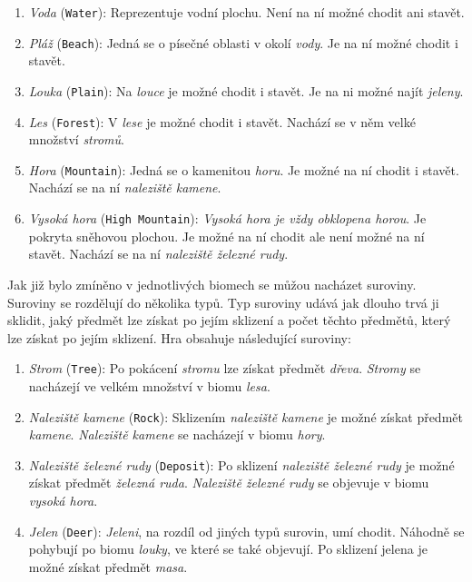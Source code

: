 \begin{enumerate}
    \item \textit{Voda} (\verb|Water|): Reprezentuje vodní plochu. Není na ní možné chodit ani stavět.
    \item \textit{Pláž} (\verb|Beach|): Jedná se o písečné oblasti v okolí \textit{vody}. Je na ní možné chodit i stavět.
    \item \textit{Louka} (\verb|Plain|): Na \textit{louce} je možné chodit i stavět. Je na ni možné najít \textit{jeleny}.
    \item \textit{Les} (\verb|Forest|): V \textit{lese} je možné chodit i stavět. Nachází se v něm velké množství \textit{stromů}.
    \item \textit{Hora} (\verb|Mountain|): Jedná se o kamenitou \textit{horu}. Je možné na ní chodit i stavět. Nachází se na ní \textit{naleziště kamene}.
    \item \textit{Vysoká hora} (\verb|High Mountain|): \textit{Vysoká hora je vždy obklopena \textit{horou}}. Je pokryta sněhovou plochou. Je možné na ní chodit ale není možné na ní stavět. Nachází se na ní \textit{naleziště železné rudy}.
\end{enumerate}

Jak již bylo zmíněno v jednotlivých biomech se můžou nacházet suroviny. Suroviny se rozdělují do několika typů. Typ suroviny udává jak dlouho trvá ji sklidit, jaký předmět lze získat po jejím sklizení a počet těchto předmětů, který lze získat po jejím sklizení. Hra obsahuje následující suroviny:

\begin{enumerate}
    \item \textit{Strom} (\verb|Tree|): Po pokácení \textit{stromu} lze získat předmět \textit{dřeva}. \textit{Stromy} se nacházejí ve velkém množství v biomu \textit{lesa}.
    \item \textit{Naleziště kamene} (\verb|Rock|): Sklizením \textit{naleziště kamene} je možné získat předmět \textit{kamene}. \textit{Naleziště kamene} se nacházejí v biomu \textit{hory}.
    \item \textit{Naleziště železné rudy} (\verb|Deposit|): Po sklizení \textit{naleziště železné rudy} je možné získat předmět \textit{železná ruda}. \textit{Naleziště železné rudy} se objevuje v biomu \textit{vysoká hora}.
    \item \textit{Jelen} (\verb|Deer|): \textit{Jeleni}, na rozdíl od jiných typů surovin, umí chodit. Náhodně se pohybují po biomu \textit{louky}, ve které se také objevují. Po sklizení jelena je možné získat předmět \textit{masa}.
\end{enumerate}


